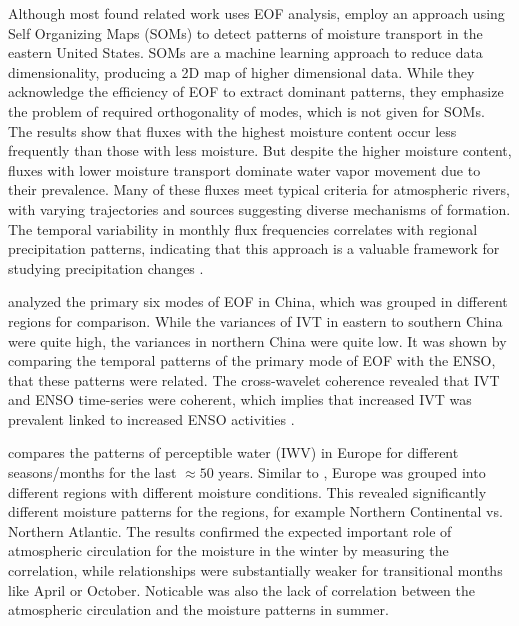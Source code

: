 Although most found related work uses EOF analysis, \citeauthor{teale_patterns_2020} employ an approach using Self Organizing Maps (SOMs) to detect patterns of moisture transport in the eastern United States.
SOMs are a machine learning approach to reduce data dimensionality, producing a 2D map of higher dimensional data. 
While they acknowledge the efficiency of EOF to extract dominant patterns, they emphasize the problem of required orthogonality of modes, which is not given for SOMs. 
The results show that fluxes with the highest moisture content occur less frequently than those with less moisture. 
But despite the higher moisture content, fluxes with lower moisture transport dominate water vapor movement due to their prevalence. 
Many of these fluxes meet typical criteria for atmospheric rivers, with varying trajectories and sources suggesting diverse mechanisms of formation. 
The temporal variability in monthly flux frequencies correlates with regional precipitation patterns, indicating that this approach is a valuable framework for studying precipitation changes \cite{teale_patterns_2020}.



\citeauthor{ayantobo_integrated_2022} analyzed the primary six modes of EOF in China, which was grouped in different regions for comparison. 
While the variances of IVT in eastern to southern China were quite high, the variances in northern China were quite low. 
It was shown by comparing the temporal patterns of the primary mode of EOF with the ENSO, that these patterns were related. 
The cross-wavelet coherence revealed that IVT and ENSO time-series were coherent, which implies that increased IVT was prevalent linked to increased ENSO activities \cite{ayantobo_integrated_2022}. 


\citeauthor{wypych_atmospheric_2018} compares the patterns of perceptible water (IWV) in Europe for different seasons/months for the last $\approx50$ years. 
Similar to \cite{ayantobo_integrated_2022}, Europe was grouped into different regions with different moisture conditions. 
This revealed significantly different moisture patterns for the regions, for example Northern Continental vs. Northern Atlantic.
The results confirmed the expected important role of atmospheric circulation for the moisture in the winter by measuring the correlation, while relationships were substantially weaker for transitional months like April or October. 
Noticable was also the lack of correlation between the atmospheric circulation and the moisture patterns in summer. 


